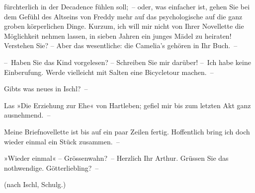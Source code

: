                fürchterlich {\pb}in der Decadence fühlen
               soll; – oder, was einfacher ist, gehen Sie bei dem Gefühl des Altseins von Freddy mehr auf das
               psychologische \label{T_L00249-1v}\label{T_L00249-1}
               auf die ganz groben körperlichen Dinge. Kurzum, ich will mir nicht von Ihrer Novellette die Möglichkeit
               nehmen lassen, in sieben Jahren ein junges Mädel zu heiraten! Verstehen Sie? – Aber
               das wesentliche: die Camelia’s gehören in Ihr
                  Buch. –\pend
           
\pstart
           – Haben Sie das Kind vorgelesen? – Schreiben Sie
               mir darüber! – Ich habe keine Einberufung. Werde vielleicht mit Salten eine Bicycletour machen. –\pend
           
\pstart
           Gibts was neues in Ischl? –\pend
           
\pstart
           Las »Die Erziehung zur Ehe« von Hartleben; gefiel mir bis zum letzten Akt ganz
               ausnehmend. –\pend
           
\pstart
           Meine Briefnovellette ist bis
               auf ein paar Zeilen fertig. Hoffentlich bring ich doch wieder einmal ein Stück
               zusammen. –\pend
           
\pstart
           »Wieder einmal« – Grössenwahn? –\pend
           \pstart Herzlich Ihr \spacefill\mbox{Arthur.}\pend{}
\pstart
           \noindent{}Grüssen Sie das nothwendige. Götterliebling? –\pend
           
\pstart
           (nach Ischl, Schulg.)\pend
           \endnumbering{}  
      